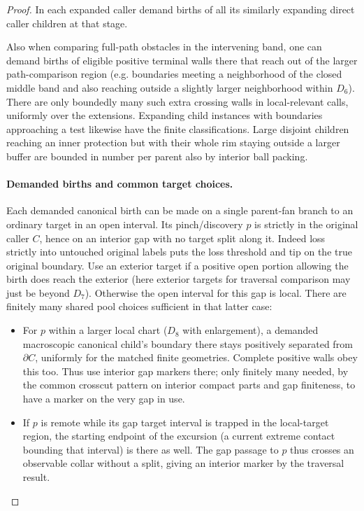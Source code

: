 \begin{proof}
In each expanded caller demand births of all its similarly expanding direct caller children at that
stage.

Also when comparing full-path obstacles in the intervening band, one can demand births of eligible
positive terminal walls there that reach out of the larger path-comparison region (e.g. boundaries meeting a
neighborhood of the closed middle band and also reaching outside a slightly larger neighborhood within
\(D_6\)). There are only boundedly many such extra crossing walls in local-relevant calls, uniformly over
the extensions. Expanding child instances with boundaries approaching a test likewise have the finite
classifications. Large disjoint children reaching an inner protection but with their whole rim staying
outside a larger buffer are bounded in number per parent also by interior ball packing.

\paragraph{Demanded births and common target choices.}

Each demanded canonical birth can be made on a single parent-fan branch to an ordinary target in an open
interval. Its pinch/discovery \(p\) is strictly in the original caller \(C\), hence on an interior gap with
no target split along it. Indeed loss strictly into untouched original labels puts the loss threshold and
tip on the true original boundary. Use an exterior target if a positive open portion allowing the birth does
reach the exterior (here exterior targets for traversal comparison may just be beyond \(D_7\)). Otherwise
the open interval for this gap is local. There are finitely many shared pool choices sufficient in that
latter case:
\begin{itemize}
\item For \(p\) within a larger local chart (\(D_8\) with enlargement), a demanded macroscopic canonical child's boundary there stays positively separated from \(\partial C\), uniformly for the matched finite geometries. Complete positive walls obey this too. Thus use interior gap markers there; only finitely many needed, by the common crosscut pattern on interior compact parts and gap finiteness, to have a marker on the very gap in use.
\item If \(p\) is remote while its gap target interval is trapped in the local-target region, the starting endpoint of the excursion (a current extreme contact bounding that interval) is there as well. The gap passage to \(p\) thus crosses an observable collar without a split, giving an interior marker by the traversal result.
\end{itemize}


\end{proof}
